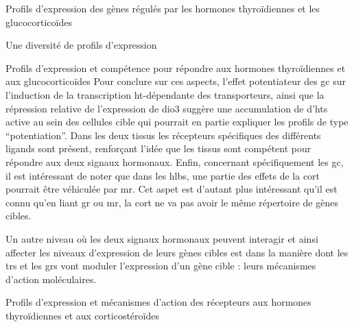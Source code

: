 \documentclass[../main.tex]{subfiles}
\begin{document}
\begin{chapter}{Profils d'expression des gènes régulés par les hormones thyroïdiennes et les glucocorticoïdes}
\begin{section}{Une diversité de profils d'expression}
\begin{subsection}{Profils d'expression et compétence pour répondre aux hormones thyroïdiennes et aux glucocorticoïdes}
Pour conclure sur ces aspects, l'effet potentiateur des \gls{gc} sur l'induction de la transcription \gls{ht}-dépendante des transporteurs, ainsi que la répression relative de l'expression de \gls{dio3} suggère une accumulation de d'\glspl{ht} active au sein des cellules cible qui pourrait en partie expliquer les profils de type ``potentiation''.
Dans les deux tissus les récepteurs spécifiques des différents ligands sont présent, renforçant l'idée que les tissus sont compétent pour répondre aux deux signaux hormonaux.
Enfin, concernant spécifiquement les \gls{gc}, il est intéressant de noter que dans les \glspl{hlb}, une partie des effets de la \gls{cort} pourrait être véhiculée par \gls{mr}.
Cet aspet est d'autant plus intéressant qu'il est connu qu'en liant \gls{gr} ou \gls{mr}, la \gls{cort} ne va pas avoir le même répertoire de gènes cibles.
\par
Un autre niveau où les deux signaux hormonaux peuvent interagir et ainsi affecter les niveaux d'expression de leurs gènes cibles est dans la manière dont les \glspl{tr} et les \glspl{gr} vont moduler l'expression d'un gène cible :
leurs mécanismes d'action moléculaires.
\end{subsection}

\end{section}


\begin{section}{Profils d'expression et mécanismes d'action des récepteurs aux hormones thyroïdiennes et aux corticostéroïdes}


\end{section}
\end{chapter}
\end{document}
